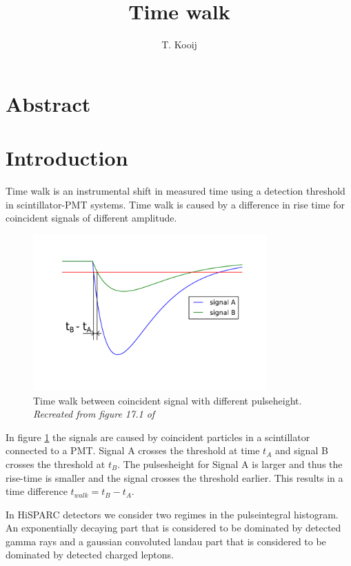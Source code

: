 \documentclass[a4paper,11pt]{article}
\author{T. Kooij}
\title{Time walk}
\begin{document}
\maketitle

\section{Abstract}

\section{Introduction}
Time walk is an instrumental shift in measured time using a detection threshold in scintillator-PMT systems. Time walk is caused by a difference in rise time for coincident signals of different amplitude.

\begin{figure}[h!]
  \centering
    \includegraphics[width=0.8\textwidth]{fig17_1.pdf}
  \caption{Time walk between coincident signal with different pulseheight. \textit {Recreated from figure 17.1 of \cite{Leo:1987} } }
  \label{fig_timewalk}
\end{figure}

In figure \ref{fig_timewalk} the signals are caused by coincident particles in a scintillator connected to a PMT. Signal A crosses the threshold at time $t_A$ and signal B crosses the threshold at $t_B$. The pulsesheight for Signal A is larger and thus the rise-time is smaller and the signal crosses the threshold earlier. This results in a time difference $t_{walk} = t_B - t_A$.

In HiSPARC detectors we consider two regimes in the pulseintegral histogram. An exponentially decaying part that is considered to be dominated by detected gamma rays and a gaussian convoluted landau part that is considered to be dominated by detected charged leptons.
\end{document}
